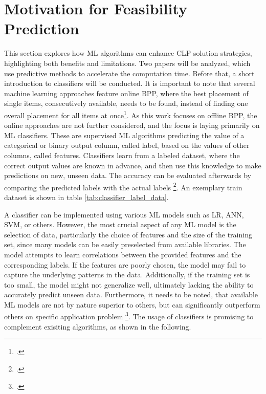 \chapter{Motivation for Feasibility Prediction}
\label{sec:motivation_feasibility_prediction}
This section explores how \gls{ML} algorithms can enhance \gls{CLP} solution strategies,
highlighting both benefits and limitations. Two papers will be
analyzed, which use predictive methods to accelerate the computation time. Before that,
a short introduction to classifiers will be conducted. It is important to note that
several machine learning approaches feature
online \gls{BPP}, where the best placement of single items, consecutively available,
needs to be found, instead of finding one overall placement for all items at once\footcite[cf.][p. 1]{ali_-line_2022}.
As this work focuses on offline \gls{BPP}, the online approaches are not further considered, and the focus is laying
primarily on \gls{ML} classifiers. These are supervised \gls{ML} algorithms predicting the
value of a categorical or binary output column, called label, based on the
values of other columns, called features. Classifiers learn from a labeled dataset,
where the correct output values are known in advance, and then use this knowledge to
make predictions on new, unseen data. The accuracy can be evaluated afterwards by comparing
the predicted labels with the actual labels \footcite[cf.][]{kotsiantis_supervised_2007}.
An exemplary train dataset is shown in table \ref{tab:classifier_label_data}.



A classifier can be implemented using various \gls{ML} models such as \gls{LR},
\gls{ANN}, \gls{SVM}, or others. However, the most crucial aspect of any
\gls{ML} model is the selection of data, particularly the choice of features and
the size of the training set, since many models can be easily preselected from available
libraries. The model attempts to learn correlations between the provided features
and the corresponding labels. If the features are poorly chosen, the model may fail
to capture the underlying patterns in the data. Additionally, if the training set
is too small, the model might not generalize well, ultimately lacking the ability
to accurately predict unseen data. Furthermore, it needs to be noted, that available
\gls{ML} models are not by nature superior to others, but can significantly outperform
others on specific application problem \footcite[cf.][pp. 250, 264]{kotsiantis_supervised_2007}.
The usage of classifiers is promising to complement exisiting algorithms, as shown in the following.

